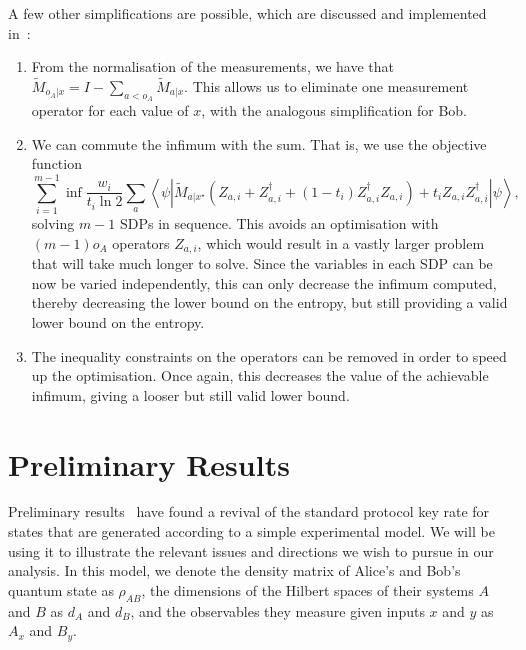 \documentclass[10pt, a4paper]{article}
\numberwithin{equation}{section} %
\theoremstyle{definition}
\theoremstyle{plain}
\newcommand{\?}{\mathrel{?}} %
\newcommand{\angleb}[1]{\left\langle #1 \right\rangle} %
\begin{document}
            A few other simplifications are possible, which are discussed and implemented in~\cite{BFF_QRE}:
            \begin{enumerate}
              \item From the normalisation of the measurements, we have that \(\tilde{M}_{o_A|x} = I - \sum_{a < o_A} \tilde{M}_{a|x}\). This allows us to eliminate one measurement operator for each value of \(x\), with the analogous simplification for Bob.
              \item We can commute the infimum with the sum. That is, we use the objective function
                \begin{equation} 
                  \sum_{i=1}^{m-1} \inf \frac{w_i}{t_i \ln 2} \sum_a \angleb{\psi\left|
                  \tilde{M}_{a|x^{\star}} \left( Z_{a,i} + Z_{a,i}^{\dagger} + (1-t_i)  Z_{a,i}^{\dagger}Z_{a,i}\right) + t_i Z_{a,i}Z_{a,i}^{\dagger} \right|\psi},
                \end{equation}
                solving \(m-1\) SDPs in sequence. This avoids an optimisation with \((m-1)o_A\) operators \(Z_{a,i}\), which would result in a vastly larger problem that will take much longer to solve. Since the variables in each SDP can be now be varied independently, this can only decrease the infimum computed, thereby decreasing the lower bound on the entropy, but still providing a valid lower bound on the entropy.
              \item The inequality constraints on the operators can be removed in order to speed up the optimisation. Once again, this decreases the value of the achievable infimum, giving a looser but still valid lower bound.
            \end{enumerate}

            \section{Preliminary Results}\label{sec:preres}

            Preliminary results~\cite{KTNotes} have found a revival of the standard protocol key rate for states that are generated according to a simple experimental model. We will be using it to illustrate the relevant issues and directions we wish to pursue in our analysis. In this model, we denote the density matrix of Alice's and Bob's quantum state as \(\rho_{AB}\), the dimensions of the Hilbert spaces of their systems \(A\) and \(B\) as \(d_A\) and \(d_B\), and the observables they measure given inputs \(x\) and \(y\) as \(A_x\) and \(B_y\).
\end{document}
